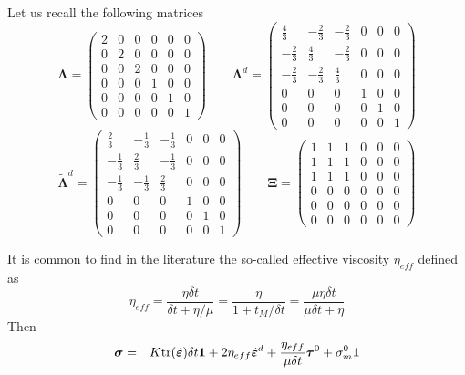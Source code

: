 Let us recall the following matrices
\[
{\bm \Lambda}=
\left(
\begin{array}{cccccc}
2 & 0 & 0 & 0 & 0 & 0 \\
0 & 2 & 0 & 0 & 0 & 0 \\
0 & 0 & 2 & 0 & 0 & 0 \\
0 & 0 & 0 & 1 & 0 & 0 \\
0 & 0 & 0 & 0 & 1 & 0 \\
0 & 0 & 0 & 0 & 0 & 1 
\end{array}
\right)
\qquad
{\bm \Lambda}^d
=
\left(
\begin{array}{cccccc}
\frac43 & - \frac23 & - \frac23 & 0 & 0 & 0 \\
-\frac23 & \frac43 & - \frac23  & 0 & 0 & 0\\
-\frac23& - \frac23 & \frac43  & 0 & 0 & 0\\
0&0&0& 1&0 &0  \\
0&0&0&0&1 &0\\
0&0&0&0&0& 1
\end{array}
\right)
\]
\[
\tilde{\bm \Lambda}^d
=
\left(
\begin{array}{cccccc}
\frac23 & - \frac13 & - \frac13 & 0 & 0 & 0 \\
-\frac13 & \frac23 & - \frac13  & 0 & 0 & 0\\
-\frac13& - \frac13 & \frac23  & 0 & 0 & 0\\
0&0&0& 1&0 &0  \\
0&0&0&0&1 &0\\
0&0&0&0&0& 1
\end{array}
\right)
\qquad
{\bm \Xi}=
\left(
\begin{array}{cccccc}
1 & 1 & 1 & 0 & 0 & 0\\ 
1 & 1 & 1 & 0 & 0 & 0\\ 
1 & 1 & 1 & 0 & 0 & 0\\ 
0 & 0 & 0 & 0 & 0 & 0 \\
0 & 0 & 0 & 0 & 0 & 0 \\
0 & 0 & 0 & 0 & 0 & 0 
\end{array}
\right)
\]

It is common to find in the literature the so-called effective 
viscosity $\eta_{eff}$ defined as 
\[
\eta_{eff}
=\frac{\eta \delta t}{\delta t + \eta/\mu}
=\frac{\eta}{1 + t_M/\delta t}
=\frac{\mu\eta \delta t}{\mu \delta t + \eta}
\]
Then 
\begin{eqnarray}
\bm \sigma 
&=& 
K {\rm tr}(\dot{\bm\varepsilon}) \delta t {\bm 1}  +
2\eta_{eff} \dot{\bm\varepsilon}^d +
\frac{ \eta_{eff}}{\mu\delta t}  \bm\tau^0 + \sigma_m^0 {\bm 1}
\end{eqnarray}



